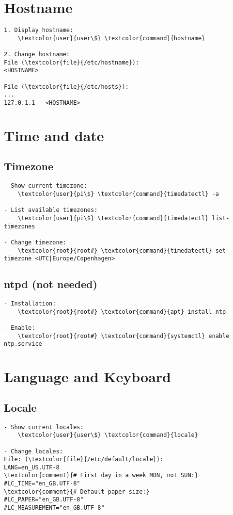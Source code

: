 \documentclass[10pt, a4paper, onecolumn, openany]{book} %
\begin{document}
\section{Hostname}
\begin{Verbatim}[commandchars=\\\{\}]
1. Display hostname:
    \textcolor{user}{user\$} \textcolor{command}{hostname}
    
2. Change hostname:
File (\textcolor{file}{/etc/hostname}):
<HOSTNAME>

File (\textcolor{file}{/etc/hosts}):
...
127.0.1.1   <HOSTNAME>
\end{Verbatim}

\section{Time and date}
\subsection{Timezone}
\begin{Verbatim}[commandchars=\\\{\}]
- Show current timezone:
    \textcolor{user}{pi\$} \textcolor{command}{timedatectl} -a

- List available timezones:
    \textcolor{user}{pi\$} \textcolor{command}{timedatectl} list-timezones
    
- Change timezone:
    \textcolor{root}{root#} \textcolor{command}{timedatectl} set-timezone <UTC|Europe/Copenhagen>
\end{Verbatim}
\subsection{ntpd (not needed)}
\begin{Verbatim}[commandchars=\\\{\}]
- Installation:
    \textcolor{root}{root#} \textcolor{command}{apt} install ntp

- Enable:
    \textcolor{root}{root#} \textcolor{command}{systemctl} enable ntp.service
\end{Verbatim}




\section{Language and Keyboard}
\subsection{Locale}
\begin{Verbatim}[commandchars=\\\{\}]
- Show current locales:
    \textcolor{user}{user\$} \textcolor{command}{locale}

- Change locales:
File: (\textcolor{file}{/etc/default/locale}):
LANG=en_US.UTF-8
\textcolor{comment}{# First day in a week MON, not SUN:}
#LC_TIME="en_GB.UTF-8"
\textcolor{comment}{# Default paper size:}
#LC_PAPER="en_GB.UTF-8"
#LC_MEASUREMENT="en_GB.UTF-8"
\end{Verbatim}
\end{document}
